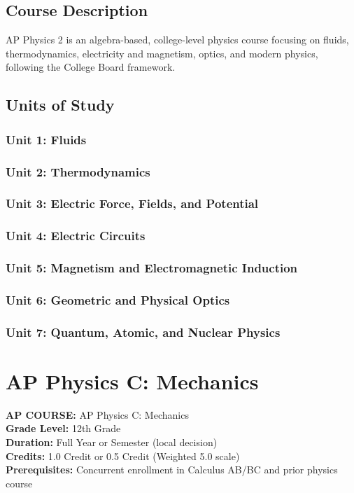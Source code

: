 \documentclass[12pt,oneside]{book}
\begin{document}
\section{Course Description}
AP Physics 2 is an algebra-based, college-level physics course focusing on fluids, thermodynamics,
electricity and magnetism, optics, and modern physics, following the College Board framework.

\section{Units of Study}
\subsection*{Unit 1: Fluids}
\subsection*{Unit 2: Thermodynamics}
\subsection*{Unit 3: Electric Force, Fields, and Potential}
\subsection*{Unit 4: Electric Circuits}
\subsection*{Unit 5: Magnetism and Electromagnetic Induction}
\subsection*{Unit 6: Geometric and Physical Optics}
\subsection*{Unit 7: Quantum, Atomic, and Nuclear Physics}

\chapter{AP Physics C: Mechanics}

\noindent\textbf{AP COURSE:} AP Physics C: Mechanics\\
\textbf{Grade Level:} 12th Grade\\
\textbf{Duration:} Full Year or Semester (local decision)\\
\textbf{Credits:} 1.0 Credit or 0.5 Credit (Weighted 5.0 scale)\\
\textbf{Prerequisites:} Concurrent enrollment in Calculus AB/BC and prior physics course
\end{document}

